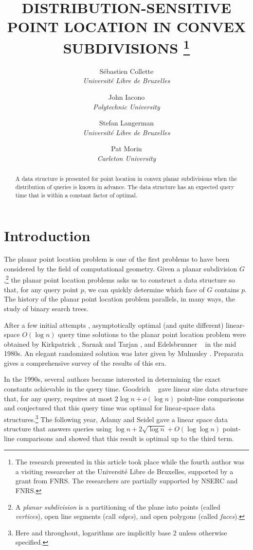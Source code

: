 \documentclass[charterfonts,lotsofwhite]{patmorin}
\title{\MakeUppercase{Distribution-Sensitive Point 
	Location in Convex Subdivisions}%
	\thanks{The research presented in this article took place
while the fourth author was a visiting researcher at the Universit\'e Libre de
Bruxelles, supported by a grant from FNRS.  The researchers are
partially supported by NSERC and FNRS.}}
\author{S\'ebastien Collette \\ \textit{Universit\'e Libre de Bruxelles}
  \and John Iacono \\ \textit{Polytechnic University}
  \and Stefan Langerman \\ \textit{Universit\'e Libre de Bruxelles}
  \and Pat Morin \\ \textit{Carleton University}}
\date{}
\begin{document}
\maketitle

\begin{abstract}
A data structure is presented for point location in convex planar
subdivisions when the distribution of queries is known in advance.
The data structure has an expected query time that is within a
constant factor of optimal.
\end{abstract}


\section{Introduction}

The planar point location problem is one of the first problems to have
been considered by the field of computational geometry. Given a planar
subdivision $G$,\footnote{A \emph{planar subdivision} is a
partitioning of the plane into points (called \emph{vertices}), open
line segments (call \emph{edges}), and open polygons (called
\emph{faces}).} the planar point location problems asks us to
construct a data structure so that, for any query point $p$, we can
quickly determine which face of $G$ contains $p$.  The history of the
planar point location problem parallels, in many ways, the study of
binary search trees.

After a few initial attempts \cite{dl76,lp77,p81}, asymptotically
optimal (and quite different) linear-space $O(\log n)$ query time
solutions to the planar point location problem were obtained by
Kirkpatrick \cite{k83}, Sarnak and Tarjan \cite{st86}, and
Edelsbrunner \etal\ \cite{egs86} in the mid 1980s.  An elegant
randomized solution was later given by Mulmuley \cite{m90}.  Preparata
\cite{p90} gives a comprehensive survey of the results of this era.

In the 1990s, several authors became interested in determining the
exact constants achievable in the query time.  Goodrich \etal\
\cite{gor97} gave linear size data structure that, for any query,
requires at most $2\log n + o(\log n)$ point-line comparisons and
conjectured that this query time was optimal for linear-space data
structures.\footnote{Here and throughout, logarithms are implicitly
base 2 unless otherwise specified.} The following year, Adamy
and Seidel \cite{as98} gave a linear space data structure that answers
queries using $\log n + 2\sqrt{\log n} + O(\log\log n)$ point-line
comparisons and showed that this result is optimal up to the third
term.
\end{document}
